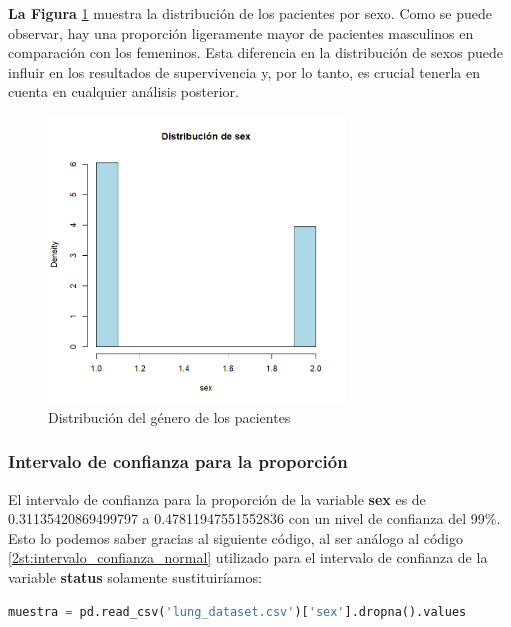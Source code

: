 \documentclass[a4paper,12pt]{article}
\begin{document}
    \textbf{La Figura }\ref{fig:sex_distribution} muestra la distribución de los pacientes por sexo. Como se puede observar, hay una proporción ligeramente mayor de pacientes masculinos en comparación con los femeninos. Esta diferencia en la distribución de sexos puede influir en los resultados de supervivencia y, por lo tanto, es crucial tenerla en cuenta en cualquier análisis posterior.

    \begin{figure}[h]
        \centering
        \includegraphics[width=0.7\textwidth]{distribucion_sex.png}
        \caption{Distribución del género de los pacientes}
        \label{fig:sex_distribution}
    \end{figure}

    \subsubsection*{Intervalo de confianza para la proporción}

    El intervalo de confianza para la proporción de la variable \textbf{sex} es de 0.31135420869499797 a 0.47811947551552836 con un nivel de confianza del 99\%. Esto lo podemos saber gracias al siguiente código, al ser análogo al código \ref{2st:intervalo_confianza_normal} utilizado para el intervalo de confianza de la variable \textbf{status} solamente sustituiríamos:

    \begin{lstlisting}[language=Python, caption={Código en Python para calcular el intervalo de confianza}]
        muestra = pd.read_csv('lung_dataset.csv')['sex'].dropna().values

    \end{lstlisting}
\end{document}
